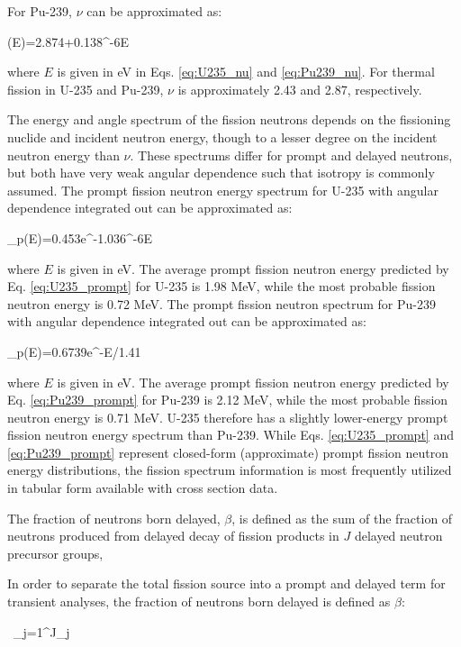 For Pu-239, \(\nu\) can be approximated as:

\beq
\label{eq:Pu239_nu}
\nu(E)=2.874+0.138^{-6}E
\eeq

where \(E\) is given in eV in Eqs. \eqref{eq:U235_nu} and \eqref{eq:Pu239_nu}. For thermal fission in U-235 and Pu-239, \(\nu\) is approximately 2.43 and 2.87, respectively. 

The energy and angle spectrum of the fission neutrons depends on the fissioning nuclide and incident neutron energy, though to a lesser degree on the incident neutron energy than \(\nu\). These spectrums differ for prompt and delayed neutrons, but both have very weak angular dependence such that isotropy is commonly assumed. The prompt fission neutron energy spectrum for U-235 with angular dependence integrated out can be approximated as:

\beq
\label{eq:U235_prompt}
\chi_p(E)=0.453e^{-1.036^{-6}E}
\eeq

where \(E\) is given in eV. The average prompt fission neutron energy predicted by Eq. \eqref{eq:U235_prompt} for U-235 is 1.98 MeV, while the most probable fission neutron energy is 0.72 MeV. The prompt fission neutron spectrum for Pu-239 with angular dependence integrated out can be approximated as:

\beq
\label{eq:Pu239_prompt}
\chi_p(E)=0.6739e^{-E/1.41}
\eeq

where \(E\) is given in eV. The average prompt fission neutron energy predicted by Eq. \eqref{eq:Pu239_prompt} for Pu-239 is 2.12 MeV, while the most probable fission neutron energy is 0.71 MeV. U-235 therefore has a slightly lower-energy prompt fission neutron energy spectrum than Pu-239. While Eqs. \eqref{eq:U235_prompt} and \eqref{eq:Pu239_prompt} represent closed-form (approximate) prompt fission neutron energy distributions, the fission spectrum information is most frequently utilized in tabular form available with cross section data.

The fraction of neutrons born delayed, \(\beta\), is defined as the sum of the fraction of neutrons produced from delayed decay of fission products in \(J\) delayed neutron precursor groups,

In order to separate the total fission source into a prompt and delayed term for transient analyses, the fraction of neutrons born delayed is defined as \(\beta\):

\beq
\label{eq:BetaDef}
\beta\equiv\ \sum_{j=1}^J\beta_j
\eeq

